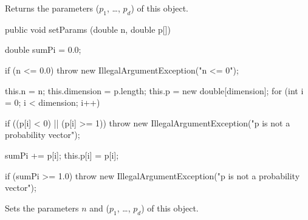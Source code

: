 \begin{tabb}
   Returns the parameters ($p_1$, \ldots, $p_d$) of this object.
\end{tabb}
\begin{code}

   public void setParams (double n, double p[])\begin{hide} {
      double sumPi = 0.0;

      if (n <= 0.0)
         throw new IllegalArgumentException("n <= 0");

      this.n = n;
      this.dimension = p.length;
      this.p = new double[dimension];
      for (int i = 0; i < dimension; i++) {
         if ((p[i] < 0) || (p[i] >= 1))
            throw new IllegalArgumentException("p is not a probability vector");

         sumPi += p[i];
         this.p[i] = p[i];
      }

      if (sumPi >= 1.0)
         throw new IllegalArgumentException("p is not a probability vector");
   }\end{hide}
\end{code}
\begin{tabb}
   Sets the parameters $n$ and ($p_1$, \ldots, $p_d$) of this object.
\end{tabb}
\begin{code}\begin{hide}
}\end{hide}
\end{code}
